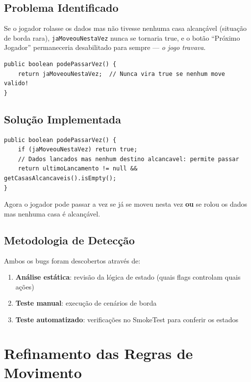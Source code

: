 \documentclass[12pt,a4paper]{report}
\begin{document}
\subsection{Problema Identificado}

Se o jogador rolasse os dados mas não tivesse nenhuma casa alcançável (situação de borda rara), \texttt{jaMoveouNestaVez} nunca se tornaria true, e o botão ``Próximo Jogador'' permaneceria desabilitado para sempre --- \textit{o jogo travava}.

\begin{lstlisting}
public boolean podePassarVez() {
    return jaMoveouNestaVez;  // Nunca vira true se nenhum move valido!
}
\end{lstlisting}

\subsection{Solução Implementada}

\begin{lstlisting}
public boolean podePassarVez() {
    if (jaMoveouNestaVez) return true;
    // Dados lancados mas nenhum destino alcancavel: permite passar
    return ultimoLancamento != null && getCasasAlcancaveis().isEmpty();
}
\end{lstlisting}

Agora o jogador pode passar a vez se já se moveu nesta vez \textbf{ou} se rolou os dados mas nenhuma casa é alcançável.

\subsection{Metodologia de Detecção}

Ambos os bugs foram descobertos através de:
\begin{enumerate}
    \item \textbf{Análise estática}: revisão da lógica de estado (quais flags controlam quais ações)
    \item \textbf{Teste manual}: execução de cenários de borda
    \item \textbf{Teste automatizado}: verificações no SmokeTest para conferir os estados
\end{enumerate}

\section{Refinamento das Regras de Movimento}
\end{document}
